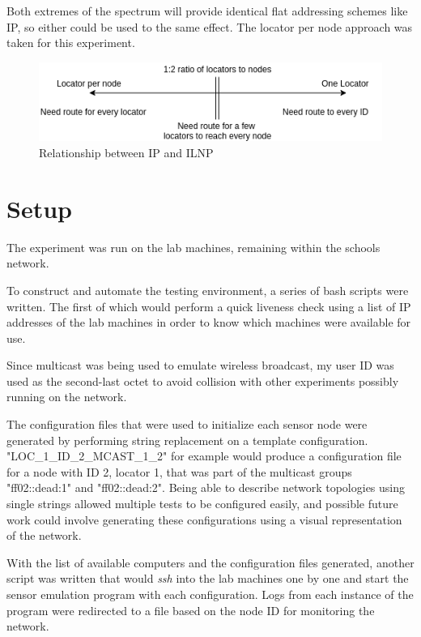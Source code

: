 \documentclass[12pt]{article}
\begin{document}
Both extremes of the spectrum will provide identical flat addressing schemes like IP, so either could be used to the same effect. The locator per node approach was taken for this experiment.

\begin{figure}[!ht]
	\centering
	\includegraphics[width=\linewidth]{images/spectrum}
	\caption{Relationship between IP and ILNP}
	\label{fig:spectrum}
\end{figure}

\section{Setup}

The experiment was run on the lab machines, remaining within the schools network. 

To construct and automate the testing environment, a series of bash scripts were written. The first of which would perform a quick liveness check using a list of IP addresses of the lab machines in order to know which machines were available for use.

Since multicast was being used to emulate wireless broadcast, my user ID was used as the second-last octet to avoid collision with other experiments possibly running on the network.

The configuration files that were used to initialize each sensor node were generated by performing string replacement on a template configuration. "LOC\_1\_ID\_2\_MCAST\_1\_2" for example would produce a configuration file for a node with ID 2, locator 1, that was part of the multicast groups "ff02::dead:1" and "ff02::dead:2". Being able to describe network topologies using single strings allowed multiple tests to be configured easily, and possible future work could involve generating these configurations using a visual representation of the network.

With the list of available computers and the configuration files generated, another script was written that would \emph{ssh} into the lab machines one by one and start the sensor emulation program with each configuration. Logs from each instance of the program were redirected to a file based on the node ID for monitoring the network.
\end{document}

